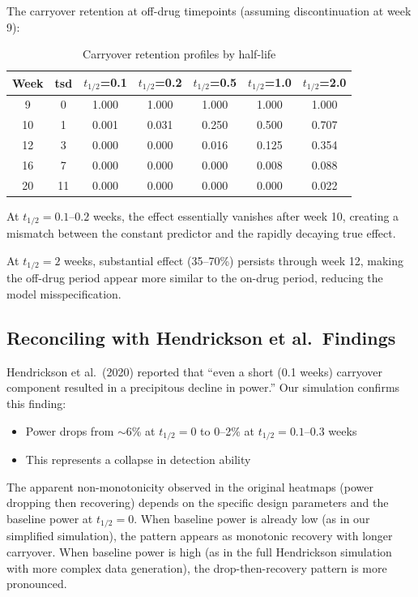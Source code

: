 \documentclass[11pt,a4paper]{article}
\begin{document}
The carryover retention at off-drug timepoints (assuming discontinuation at week 9):

\begin{table}[H]
\centering
\begin{tabular}{@{}ccccccc@{}}
\toprule
Week & tsd & $t_{1/2}$=0.1 & $t_{1/2}$=0.2 & $t_{1/2}$=0.5 & $t_{1/2}$=1.0 & $t_{1/2}$=2.0 \\
\midrule
9 & 0 & 1.000 & 1.000 & 1.000 & 1.000 & 1.000 \\
10 & 1 & 0.001 & 0.031 & 0.250 & 0.500 & 0.707 \\
12 & 3 & 0.000 & 0.000 & 0.016 & 0.125 & 0.354 \\
16 & 7 & 0.000 & 0.000 & 0.000 & 0.008 & 0.088 \\
20 & 11 & 0.000 & 0.000 & 0.000 & 0.000 & 0.022 \\
\bottomrule
\end{tabular}
\caption{Carryover retention profiles by half-life}
\end{table}

At $t_{1/2} = 0.1$--$0.2$ weeks, the effect essentially vanishes after week 10, creating
a mismatch between the constant predictor and the rapidly decaying true effect.

At $t_{1/2} = 2$ weeks, substantial effect (35--70\%) persists through week 12, making
the off-drug period appear more similar to the on-drug period, reducing the
model misspecification.

\subsection{Reconciling with Hendrickson et al.\ Findings}

Hendrickson et al.\ (2020) reported that ``even a short (0.1 weeks) carryover
component resulted in a precipitous decline in power.'' Our simulation confirms
this finding:

\begin{itemize}
    \item Power drops from $\sim$6\% at $t_{1/2}=0$ to 0--2\% at $t_{1/2}=0.1$--$0.3$ weeks
    \item This represents a collapse in detection ability
\end{itemize}

The apparent non-monotonicity observed in the original heatmaps (power dropping
then recovering) depends on the specific design parameters and the baseline
power at $t_{1/2}=0$. When baseline power is already low (as in our simplified
simulation), the pattern appears as monotonic recovery with longer carryover.
When baseline power is high (as in the full Hendrickson simulation with more
complex data generation), the drop-then-recovery pattern is more pronounced.
\end{document}

